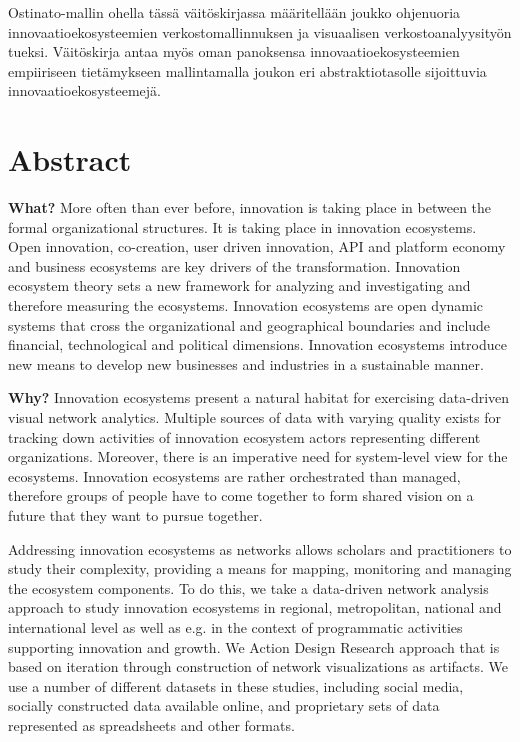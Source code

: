 Ostinato-mallin ohella tässä väitöskirjassa määritellään joukko ohjenuoria innovaatioekosysteemien verkostomallinnuksen ja visuaalisen verkostoanalyysityön tueksi. Väitöskirja antaa myös oman panoksensa innovaatioekosysteemien empiiriseen tietämykseen mallintamalla joukon eri abstraktiotasolle sijoittuvia innovaatioekosysteemejä.

\chapter{Abstract}
\label{chapter:abstract}

\textbf{What?} 
More often than ever before, innovation is taking place in between the formal organizational structures. It is taking place in innovation ecosystems. Open innovation, co-creation, user driven innovation, API and platform economy and business ecosystems are key drivers of the transformation. Innovation ecosystem theory sets a new framework for analyzing and investigating and therefore measuring the ecosystems. Innovation ecosystems are open dynamic systems that cross the organizational and geographical boundaries and include financial, technological and political dimensions. Innovation ecosystems introduce new means to develop new businesses and industries in a sustainable manner. 

\textbf{Why?} Innovation ecosystems present a natural habitat for exercising data-driven visual network analytics. Multiple sources of data with varying quality exists for tracking down activities of innovation ecosystem actors representing different organizations. Moreover, there is an imperative need for system-level view for the ecosystems. Innovation ecosystems are rather orchestrated than managed, therefore groups of people have to come together to form shared vision on a future that they want to pursue together.  

Addressing innovation ecosystems as networks allows scholars and practitioners to study their complexity, providing a means for mapping, monitoring and managing the ecosystem components. To do this, we take a data-driven network analysis approach to study innovation ecosystems in regional, metropolitan, national and international level as well as e.g. in the context of programmatic activities supporting innovation and growth. We Action Design Research approach that is based on iteration through construction of network visualizations as artifacts. We use a number of different datasets in these studies, including social media, socially constructed data available online, and proprietary sets of data represented as spreadsheets and other formats.

